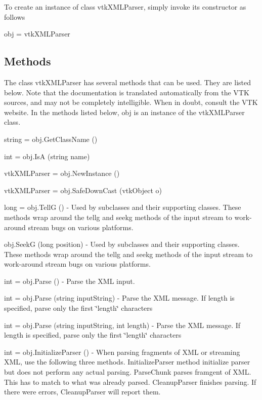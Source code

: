 To create an instance of class vtk\-X\-M\-L\-Parser, simply invoke its constructor as follows \begin{DoxyVerb}  obj = vtkXMLParser
\end{DoxyVerb}
 \hypertarget{vtkwidgets_vtkxyplotwidget_Methods}{}\subsection{Methods}\label{vtkwidgets_vtkxyplotwidget_Methods}
The class vtk\-X\-M\-L\-Parser has several methods that can be used. They are listed below. Note that the documentation is translated automatically from the V\-T\-K sources, and may not be completely intelligible. When in doubt, consult the V\-T\-K website. In the methods listed below, {\ttfamily obj} is an instance of the vtk\-X\-M\-L\-Parser class. 
\begin{DoxyItemize}
\item {\ttfamily string = obj.\-Get\-Class\-Name ()}  
\item {\ttfamily int = obj.\-Is\-A (string name)}  
\item {\ttfamily vtk\-X\-M\-L\-Parser = obj.\-New\-Instance ()}  
\item {\ttfamily vtk\-X\-M\-L\-Parser = obj.\-Safe\-Down\-Cast (vtk\-Object o)}  
\item {\ttfamily long = obj.\-Tell\-G ()} -\/ Used by subclasses and their supporting classes. These methods wrap around the tellg and seekg methods of the input stream to work-\/around stream bugs on various platforms.  
\item {\ttfamily obj.\-Seek\-G (long position)} -\/ Used by subclasses and their supporting classes. These methods wrap around the tellg and seekg methods of the input stream to work-\/around stream bugs on various platforms.  
\item {\ttfamily int = obj.\-Parse ()} -\/ Parse the X\-M\-L input.  
\item {\ttfamily int = obj.\-Parse (string input\-String)} -\/ Parse the X\-M\-L message. If length is specified, parse only the first \char`\"{}length\char`\"{} characters  
\item {\ttfamily int = obj.\-Parse (string input\-String, int length)} -\/ Parse the X\-M\-L message. If length is specified, parse only the first \char`\"{}length\char`\"{} characters  
\item {\ttfamily int = obj.\-Initialize\-Parser ()} -\/ When parsing fragments of X\-M\-L or streaming X\-M\-L, use the following three methods. Initialize\-Parser method initialize parser but does not perform any actual parsing. Parse\-Chunk parses framgent of X\-M\-L. This has to match to what was already parsed. Cleanup\-Parser finishes parsing. If there were errors, Cleanup\-Parser will report them.  

\end{DoxyItemize}
